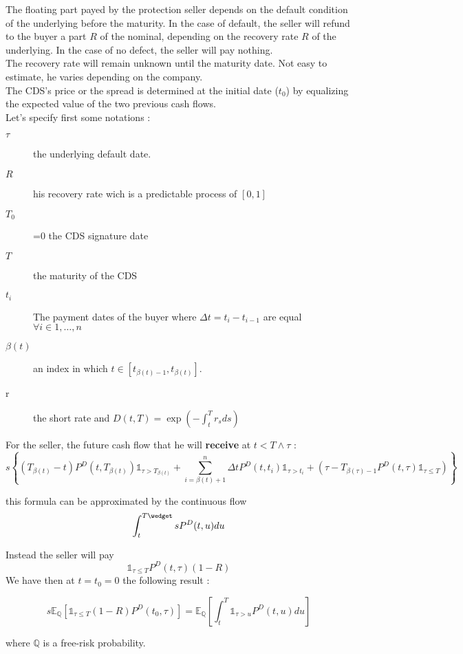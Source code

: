 The  floating  part payed  by  the  protection  seller  depends on  the  default
condition of  the underlying before the  maturity.  In the case  of default, the
seller will  refund to the  buyer a  part $R$ of  the nominal, depending  on the
recovery rate $R$ of  the underlying. In the case of no  defect, the seller will
pay nothing.\\

The recovery rate will remain unknown until the maturity date. Not easy to estimate,
he varies depending on the company.\\

The CDS's  price or  the spread  is determined  at the  initial date  ($t_0$) by
equalizing the expected value of the two previous cash flows.\\

Let's specify first some notations :
\begin{description}
\item[$\tau$] the underlying default date.
\item[$R$] his recovery rate wich is a predictable process of $[0,1]$
\item[$T_0$] =0 the CDS signature date
\item[$T$] the maturity of the CDS
\item[$t_i$] The  payment dates  of the buyer  where $\Delta  t=t_i-t_{i-1}$ are
  equal $\forall i \in 1,\dots,n$
\item[$\beta(t)$] an index in which $t\in[t_{\beta(t)-1},t_{\beta(t)}]$.
\item[r] the short rate and $D(t,T)=\exp(-\int_t^Tr_sds)$
\end{description}

For the seller, the future cash flow that he will \textbf{receive} at $t<T\wedge\tau$ :
\[
s\left\{(T_{\beta(t)}-t)P^D(t,T_{\beta(t)})\mathds{1}_{\tau>T_{\beta(t)}}+
\sum^n_{i=\beta(t)+1}\Delta                                                    t
P^D(t,t_i)\mathds{1}_{\tau>t_i}+(\tau-T_{\beta(\tau)-1}P^D(t,\tau)\mathds{1}_{\tau
  \leq
  T})\right\}
\]

this formula can be approximated by the continuous flow
\[
\int_t^{T\wedget}sP^D(t,u)du
\]

Instead the seller will pay 
\[
\mathds{1}_{\tau \leq T}P^D(t,\tau)(1-R)
\]
We have then at $t=t_0=0$ the following result :

\begin{equation}
  \label{eq:1}
s\mathbb{E}_{\mathbb{Q}}\left[\mathds{1}_{\tau \leq T}(1-R)P^D(t_0,\tau)\right]=
\mathbb{E}_\mathbb{Q}\left[\int_t^T\mathds{1}_{\tau>u}P^D(t,u)du\right]
  
\end{equation}


where $\mathbb{Q}$ is a free-risk probability.









